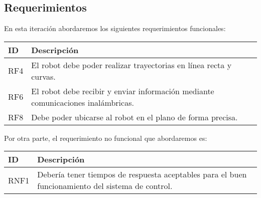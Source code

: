 \subsection{Requerimientos}

En esta iteración abordaremos los siguientes requerimientos funcionales:

\begin{center}
    \begin{tabular} {
        | >{\centering\arraybackslash}m{1cm}
        | >{\centering\arraybackslash}m{13cm} |}
        \hline
            ID & Descripción \\
        \hline
            RF4 & El robot debe poder realizar trayectorias en línea recta y curvas. \\
        \hline
            RF6 & El robot debe recibir y enviar información mediante comunicaciones inalámbricas. \\
        \hline
            RF8 & Debe poder ubicarse al robot en el plano de forma precisa. \\
        \hline
    \end{tabular}
\end{center}

   Por otra parte, el requerimiento no funcional que abordaremos es:

\begin{center}
    \begin{tabular} {
        | >{\centering\arraybackslash}m{1cm}
        | >{\centering\arraybackslash}m{13cm} |}
        \hline
            ID & Descripción \\
        \hline
            RNF1 & Debería tener tiempos de respuesta aceptables para el buen funcionamiento del sistema de control. \\
        \hline
    \end{tabular}
\end{center}